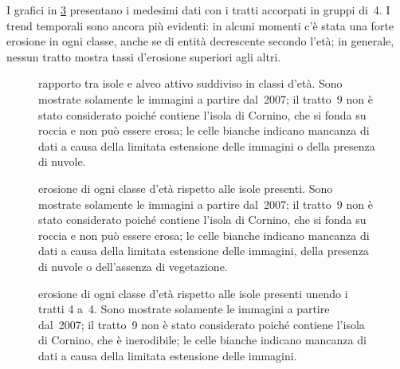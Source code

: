 I grafici in \cref{graph:erosione-classi-eta-4tr-matrix} presentano i medesimi dati con i tratti accorpati in gruppi di~4.
I trend temporali sono ancora più evidenti: in alcuni momenti c'è stata una forte erosione in ogni classe, anche se di entità decrescente secondo l'età; in generale, nessun tratto mostra tassi d'erosione superiori agli altri.
%
\begin{landscape}
\begin{figure}
	\centering
	
	\vspace*{-1cm}
	\caption[rapporto tra isole e alveo attivo suddiviso in classi d'età]{rapporto tra isole e alveo attivo suddiviso in classi d'età.
	Sono mostrate solamente le immagini a partire dal~2007; il tratto~9 non è stato considerato poiché contiene l'isola di Cornino, che si fonda su roccia e non può essere erosa; le celle bianche indicano mancanza di dati a causa della limitata estensione delle immagini o della presenza di nuvole.}
	\label{graph:rapp-isl-classi-eta-matrix}
\end{figure}
\end{landscape}
%
%
\begin{landscape}
\begin{figure}
	\centering
	
	\vspace*{-1cm}
	\caption[erosione di ogni classe d'età rispetto alle isole presenti]{erosione di ogni classe d'età rispetto alle isole presenti.
	Sono mostrate solamente le immagini a partire dal~2007; il tratto~9 non è stato considerato poiché contiene l'isola di Cornino, che si fonda su roccia e non può essere erosa; le celle bianche indicano mancanza di dati a causa della limitata estensione delle immagini, della presenza di nuvole o dell'assenza di vegetazione.}
	\label{graph:erosione-classi-eta-matrix}
\end{figure}
\end{landscape}
%
%
\begin{figure}
	\centering
	
	\vspace*{-1cm}
	\caption[erosione di ogni classe d'età rispetto alle isole presenti unendo i tratti 4 a~4]{erosione di ogni classe d'età rispetto alle isole presenti unendo i tratti 4 a~4.
	Sono mostrate solamente le immagini a partire dal~2007; il tratto~9 non è stato considerato poiché contiene l'isola di Cornino, che è inerodibile; le celle bianche indicano mancanza di dati a causa della limitata estensione delle immagini.}
	\label{graph:erosione-classi-eta-4tr-matrix}
\end{figure}
%

